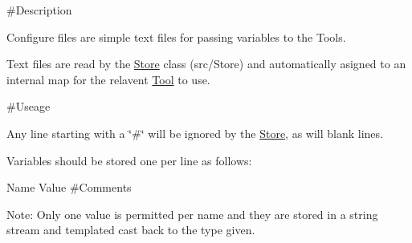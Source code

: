  \#\+Description 


Configure files are simple text files for passing variables to the Tools.

Text files are read by the \mbox{\hyperlink{classStore}{Store}} class (src/\+Store) and automatically asigned to an internal map for the relavent \mbox{\hyperlink{classTool}{Tool}} to use.

 \#\+Useage 


Any line starting with a \char`\"{}\#\char`\"{} will be ignored by the \mbox{\hyperlink{classStore}{Store}}, as will blank lines.

Variables should be stored one per line as follows\+:

Name Value \#\+Comments

Note\+: Only one value is permitted per name and they are stored in a string stream and templated cast back to the type given. 
